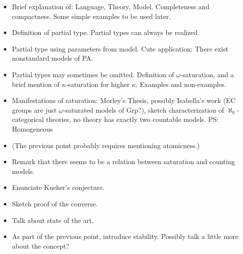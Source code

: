 \documentclass{article}
\theoremstyle{nonumberplain}
\begin{document}
\begin{itemize}
\item Brief explanation of: Language, Theory, Model. Completeness and compactness. Some simple examples to be used later.
\item Definition of partial type. Partial types can always be realized.
\item Partial type using parameters from model. Cute application: There exist nonstandard models of PA.
\item Partial types may sometimes be omitted. Definition of $\omega$-saturation, and a brief mention of $\kappa$-saturation for higher $\kappa$. Examples and non-examples.
\item Manifestations of saturation: Morley's Thesis, possibly Isabella's work (EC groups are just $\omega$-saturated models of Grp?), sketch characterization of $\aleph_0$-categorical theories, no theory has exactly two countable models. PS: Homogeneous
\item (The previous point probably requires mentioning atomicness.)
\item Remark that there seems to be a relation between saturation and counting models.
\item Enunciate Kueker's conjecture.
\item Sketch proof of the converse.
\item Talk about state of the art.
\item As part of the previous point, introduce stability. Possibly talk a little more about the concept?
\end{itemize}



\end{document}
